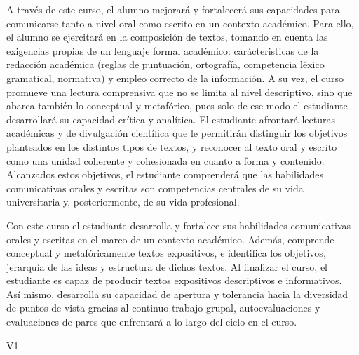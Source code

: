 \begin{syllabus}


\begin{justification}
A través de este curso, el alumno mejorará y fortalecerá sus capacidades para comunicarse tanto a nivel oral como escrito en un contexto académico. Para ello, el alumno se ejercitará en la composición de textos, tomando en cuenta las exigencias propias de un lenguaje formal académico: carácteristicas de la redacción académica (reglas de puntuación, ortografía, competencia léxico gramatical, normativa) y empleo correcto de la información. A su vez, el curso promueve una lectura comprensiva que no se limita al nivel descriptivo, sino que abarca también lo conceptual y metafórico, pues solo de ese modo el estudiante desarrollará su capacidad crítica y analítica. El estudiante afrontará lecturas académicas y de divulgación científica que le permitirán distinguir los objetivos planteados en los distintos tipos de textos, y reconocer al texto oral y escrito como una unidad coherente y cohesionada en cuanto a forma y contenido. Alcanzados estos objetivos, el estudiante comprenderá que las habilidades comunicativas orales y escritas son competencias centrales de su vida universitaria y, posteriormente, de su vida profesional. 
\end{justification}

\begin{goals}
\item Con este curso el estudiante desarrolla y fortalece sus habilidades comunicativas orales y escritas en el marco de un contexto académico. Además, comprende conceptual y metafóricamente textos expositivos, e identifica los objetivos, jerarquía de las ideas y estructura de dichos textos. Al finalizar el curso, el estudiante es capaz de producir textos expositivos descriptivos e informativos. Así­ mismo, desarrolla su capacidad de apertura y tolerancia hacia la diversidad de puntos de vista gracias al continuo trabajo grupal, autoevaluaciones y evaluaciones de pares que enfrentará a lo largo del ciclo en el curso. 
\end{goals}

\begin{outcomes}{V1}
     \item {}
     \item {}
     \item {}
     \item {}
\end{outcomes}


\end{syllabus}
